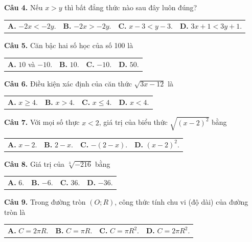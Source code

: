 \documentclass[11pt,a4paper]{article}
\begin{document}
\vspace{1.5mm}
\textbf{Câu 4.} Nếu $x > y$ thì bất đẳng thức nào sau đây luôn đúng?\\
\begin{tabularx}{\linewidth}{XXXX}
\textbf{A.} $-2x < -2y$. & \textbf{B.} $-2x > -2y$. & \textbf{C.} $x - 3 < y - 3$. & \textbf{D.} $3x + 1 < 3y + 1$.
\end{tabularx}

\vspace{1.5mm}
\textbf{Câu 5.} Căn bậc hai số học của số 100 là\\
\begin{tabularx}{\linewidth}{XXXX}
\textbf{A.} $10$ và $-10$. & \textbf{B.} $10$. & \textbf{C.} $-10$. & \textbf{D.} $50$.
\end{tabularx}

\vspace{1.5mm}
\textbf{Câu 6.} Điều kiện xác định của căn thức $\sqrt{3x - 12}$ là\\
\begin{tabularx}{\linewidth}{XXXX}
\textbf{A.} $x \ge 4$. & \textbf{B.} $x > 4$. & \textbf{C.} $x \le 4$. & \textbf{D.} $x < 4$.
\end{tabularx}

\vspace{1.5mm}
\textbf{Câu 7.} Với mọi số thực $x < 2$, giá trị của biểu thức $\sqrt{(x-2)^2}$ bằng\\
\begin{tabularx}{\linewidth}{XXXX}
\textbf{A.} $x - 2$. & \textbf{B.} $2 - x$. & \textbf{C.} $-(2-x)$. & \textbf{D.} $(x-2)^2$.
\end{tabularx}

\vspace{1.5mm}
\textbf{Câu 8.} Giá trị của $\sqrt[3]{-216}$ bằng\\
\begin{tabularx}{\linewidth}{XXXX}
\textbf{A.} $6$. & \textbf{B.} $-6$. & \textbf{C.} $36$. & \textbf{D.} $-36$.
\end{tabularx}

\vspace{1.5mm}
\textbf{Câu 9.} Trong đường tròn $(O; R)$, công thức tính chu vi (độ dài) của đường tròn là\\
\begin{tabularx}{\linewidth}{XXXX}
\textbf{A.} $C = 2\pi R$. & \textbf{B.} $C = \pi R$. & \textbf{C.} $C = \pi R^2$. & \textbf{D.} $C = 2\pi R^2$.
\end{tabularx}
\end{document}
